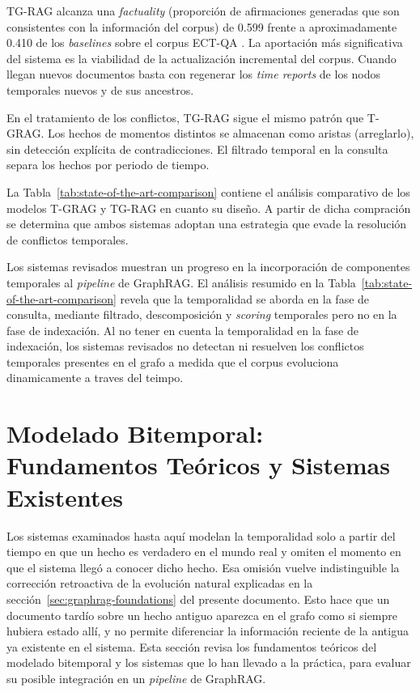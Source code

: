 TG-RAG alcanza una \emph{factuality} (proporción de afirmaciones generadas que son consistentes con la información del corpus) de 0.599 frente a aproximadamente 0.410 de los \emph{baselines} sobre el corpus ECT-QA \cite{tg_rag2025}. La aportación más significativa del sistema es la viabilidad de la actualización incremental del corpus. Cuando llegan nuevos documentos basta con regenerar los \emph{time reports} de los nodos temporales nuevos y de sus ancestros. 

En el tratamiento de los conflictos, TG-RAG sigue el mismo patrón que T-GRAG. Los hechos de momentos distintos se almacenan como aristas (arreglarlo), sin detección explícita de contradicciones. El filtrado temporal en la consulta separa los hechos por periodo de tiempo.

La Tabla~\ref{tab:state-of-the-art-comparison} contiene el análisis comparativo de los modelos T-GRAG y TG-RAG en cuanto su diseño. A partir de dicha compración se determina que ambos sistemas adoptan una estrategia que evade la resolución de conflictos temporales.


Los sistemas revisados muestran un progreso en la incorporación de componentes temporales al \emph{pipeline} de GraphRAG. El análisis resumido en la Tabla~\ref{tab:state-of-the-art-comparison} revela que la temporalidad se aborda en la fase de consulta, mediante filtrado, descomposición y \emph{scoring} temporales pero no en la fase de indexación. Al no tener en cuenta la temporalidad en la fase de indexación, los sistemas revisados no detectan ni resuelven los conflictos temporales presentes en el grafo a medida que el corpus evoluciona dinamicamente a traves del teimpo.
\section{Modelado Bitemporal: Fundamentos Teóricos y Sistemas Existentes}\label{sec:bitemporal}

Los sistemas examinados hasta aquí modelan la temporalidad solo a partir del tiempo en que un hecho es verdadero en el mundo real y omiten el momento en que el sistema llegó a conocer dicho hecho. Esa omisión vuelve indistinguible la corrección retroactiva de la evolución natural explicadas en la sección~\ref{sec:graphrag-foundations} del presente documento. Esto hace que un documento tardío sobre un hecho antiguo aparezca en el grafo como si siempre hubiera estado allí, y no permite diferenciar la información reciente de la antigua ya existente en el sistema. Esta sección revisa los fundamentos teóricos del modelado bitemporal y los sistemas que lo han llevado a la práctica, para evaluar su posible integración en un \emph{pipeline} de GraphRAG.

